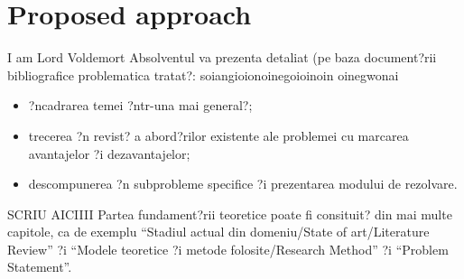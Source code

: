 \chapter{Proposed approach}
\label{CapFT}

I am Lord Voldemort
Absolventul va prezenta detaliat (pe baza document?rii bibliografice problematica tratat?:
soiangioionoinegoioinoin oinegwonai
\begin{itemize}
	\item ?ncadrarea temei ?ntr-una mai general?;
	\item trecerea ?n revist? a abord?rilor existente ale problemei cu marcarea avantajelor ?i dezavantajelor;
	\item descompunerea ?n subprobleme specifice ?i prezentarea modului de rezolvare.
\end{itemize}


SCRIU AICIIII
	Partea fundament?rii teoretice poate fi consituit? din mai multe capitole, ca de exemplu ``Stadiul actual din domeniu/State of art/Literature Review'' ?i ``Modele teoretice ?i metode folosite/Research Method'' ?i ``Problem Statement''.

